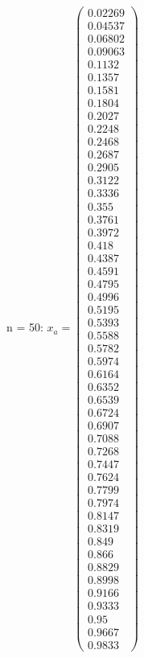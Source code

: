 \documentclass{udpreport}
\begin{document}
\begin{enumerate}
\begin{enumerate}
\begin{itemize}
\begin{itemize}
				n = 50: $x_{a} = \left(\begin{array}{c} 0.02269\\ 0.04537\\ 0.06802\\ 0.09063\\ 0.1132\\ 0.1357\\ 0.1581\\ 0.1804\\ 0.2027\\ 0.2248\\ 0.2468\\ 0.2687\\ 0.2905\\ 0.3122\\ 0.3336\\ 0.355\\ 0.3761\\ 0.3972\\ 0.418\\ 0.4387\\ 0.4591\\ 0.4795\\ 0.4996\\ 0.5195\\ 0.5393\\ 0.5588\\ 0.5782\\ 0.5974\\ 0.6164\\ 0.6352\\ 0.6539\\ 0.6724\\ 0.6907\\ 0.7088\\ 0.7268\\ 0.7447\\ 0.7624\\ 0.7799\\ 0.7974\\ 0.8147\\ 0.8319\\ 0.849\\ 0.866\\ 0.8829\\ 0.8998\\ 0.9166\\ 0.9333\\ 0.95\\ 0.9667\\ 0.9833 \end{array}\right)$
				

\end{itemize}
\end{itemize}
\end{enumerate}
\end{enumerate}
\end{document}
